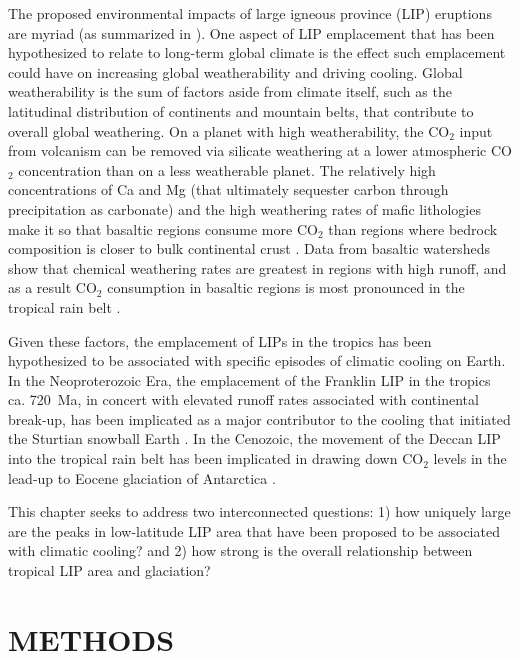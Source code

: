 \documentclass[11pt,letterpaper]{article}
\begin{document}
The proposed environmental impacts of large igneous province (LIP) eruptions are myriad (as summarized in \citealp{Ernst2017a}). One aspect of LIP emplacement that has been hypothesized to relate to long-term global climate is the effect such emplacement could have on increasing global weatherability and driving cooling. Global weatherability is the sum of factors aside from climate itself, such as the latitudinal distribution of continents and mountain belts, that contribute to overall global weathering. On a planet with high weatherability, the CO$_2$ input from volcanism can be removed via silicate weathering at a lower atmospheric CO$_2$ concentration than on a less weatherable planet. The relatively high concentrations of Ca and Mg (that ultimately sequester carbon through precipitation as carbonate) and the high weathering rates of mafic lithologies make it so that basaltic regions consume more CO$_2$ than regions where bedrock composition is closer to bulk continental crust \citep{Dessert2003a}. Data from basaltic watersheds show that chemical weathering rates are greatest in regions with high runoff, and as a result CO$_2$ consumption in basaltic regions is most pronounced in the tropical rain belt \citep{Dessert2003a, Hartmann2014a}.

Given these factors, the emplacement of LIPs in the tropics has been hypothesized to be associated with specific episodes of climatic cooling on Earth. In the Neoproterozoic Era, the emplacement of the Franklin LIP in the tropics ca. 720~Ma, in concert with elevated runoff rates associated with continental break-up, has been implicated as a major contributor to the cooling that initiated the Sturtian snowball Earth \citep{Donnadieu2004b, Cox2016a}. In the Cenozoic, the movement of the Deccan LIP into the tropical rain belt has been implicated in drawing down CO$_2$ levels in the lead-up to Eocene glaciation of Antarctica \citep{Kent2008a}.

This chapter seeks to address two interconnected questions: 1) how uniquely large are the peaks in low-latitude LIP area that have been proposed to be associated with climatic cooling? and 2) how strong is the overall relationship between tropical LIP area and glaciation?

\section*{METHODS}
\end{document}
